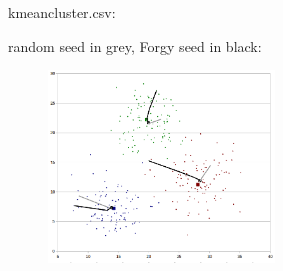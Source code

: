 kmeancluster.csv:\\
\begin{scriptsize}
\begin{ttfamily}

\end{ttfamily}
\end{scriptsize}

random seed in grey, Forgy seed in black:\\
\begin{center}
\begin{figure}[H]
\centering\includegraphics[width=6cm]{./kmeansclustering.png}\\
\end{figure}
\end{center}
